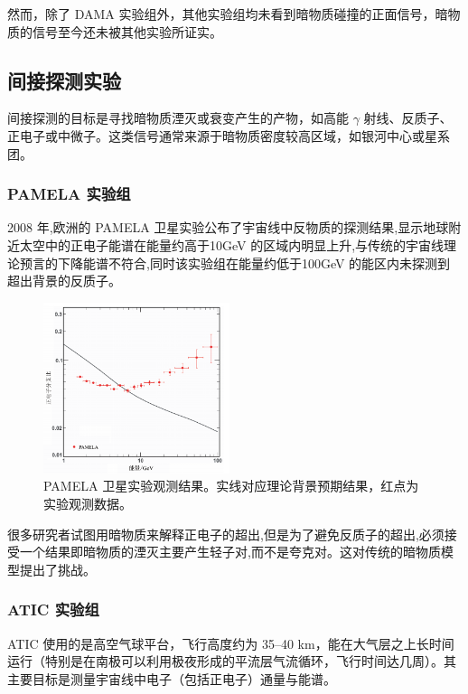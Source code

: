 然而，除了 DAMA 实验组外，其他实验组均未看到暗物质碰撞的正面信号，暗物质的信号至今还未被其他实验所证实。

\subsection{间接探测实验}

间接探测的目标是寻找暗物质湮灭或衰变产生的产物，如高能 $\gamma$ 射线、反质子、正电子或中微子。这类信号通常来源于暗物质密度较高区域，如银河中心或星系团。

\subsubsection{PAMELA 实验组}

2008 年,欧洲的 PAMELA 卫星实验公布了宇宙线中反物质的探测结果,显示地球附近太空中的正电子能谱在能量约高于10GeV 的区域内明显上升,与传统的宇宙线理论预言的下降能谱不符合,同时该实验组在能量约低于100GeV 的能区内未探测到超出背景的反质子。

\begin{figure}[!htbp]
    \centering    
    \includegraphics[height=5cm]{Img/4-2.png}
    \caption{PAMELA 卫星实验观测结果。实线对应理论背景预期结果，红点为实验观测数据。 }
    \label{4-2}
\end{figure}

很多研究者试图用暗物质来解释正电子的超出,但是为了避免反质子的超出,必须接受一个结果即暗物质的湮灭主要产生轻子对,而不是夸克对。这对传统的暗物质模型提出了挑战。

\subsubsection{ATIC 实验组}

ATIC 使用的是高空气球平台，飞行高度约为 35–40 km，能在大气层之上长时间运行（特别是在南极可以利用极夜形成的平流层气流循环，飞行时间达几周）。其主要目标是测量宇宙线中电子（包括正电子）通量与能谱。

